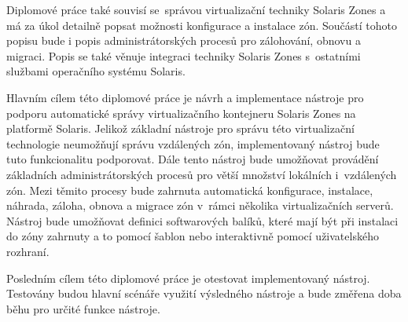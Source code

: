 Diplomové práce také souvisí se~správou virtualizační techniky Solaris Zones a má za úkol detailně popsat možnosti konfigurace a instalace
zón. Součástí tohoto popisu bude i popis administrátorských procesů pro zálohování, obnovu a migraci. Popis se také věnuje integraci
techniky Solaris Zones s~ostatními službami operačního systému Solaris.

Hlavním cílem této diplomové práce je návrh a implementace nástroje pro podporu automatické správy virtualizačního kontejneru
Solaris Zones na platformě Solaris. Jelikož základní nástroje pro správu této virtualizační technologie neumožňují správu vzdálených
zón, implementovaný nástroj bude tuto funkcionalitu podporovat. Dále tento nástroj bude umožňovat provádění základních administrátorských
procesů pro větší množství lokálních i~vzdálených zón. Mezi těmito procesy bude zahrnuta automatická konfigurace, instalace, náhrada,
záloha, obnova a migrace zón v~rámci několika virtualizačních serverů. Nástroj bude umožňovat definici softwarových balíků, které mají být
při instalaci do zóny zahrnuty a to pomocí šablon nebo interaktivně pomocí uživatelského rozhraní.

Posledním cílem této diplomové práce je otestovat implementovaný nástroj. Testovány budou hlavní scénáře využití výsledného nástroje
a bude změřena doba běhu pro určité funkce nástroje.
